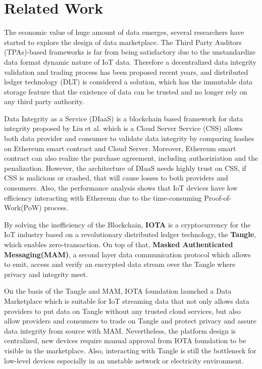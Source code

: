 \documentclass[journal,10pt,a4paper]{IEEEtran}
\begin{document}
\section{\normalsize\textbf{Related Work}}
The economic value of huge amount of data emerges, several researchers have started to explore the design of data marketplace. The Third Party Auditors (TPAs)-based frameworks\cite{TPA} is far from being satisfactory due to the unstandardize data format dynamic nature of IoT data. Therefore a decentralized data integrity validation and trading process has been proposed recent years, and distributed ledger technology (DLT) is considered a solution, which has the immutable data storage feature that the existence of data can be trusted and no longer rely on any third party authority.

Data Integrity as a Service (DIaaS) is a blockchain based framework for data integrity proposed by Liu et al.\cite{DIaas} which is a Cloud Server Service (CSS) allows both data provider and consumer to validate data integrity by comparing hashes on Ethereum smart contract\cite{smartContract} and Cloud Server. Moreover, Ethereum smart contract can also realize the purchase agreement, including authoriziation and the penalization. However, the architecture of DIaaS needs highly trust on CSS, if CSS is malicious or crashed, that will cause losses to both providers and consumers. Also, the performance analysis shows that IoT devices have low efficiency interacting with Ethereum due to the time-consuming Proof-of-Work(PoW) process.

By solving the inefficiency of the Blockchain, \textbf{IOTA}\cite{IOTAwhitepaper} is a cryptocurrency for the IoT industry based on a revolutionary distributed ledger technology, the \textbf{Tangle}, which enables zero-transaction. On top of that, \textbf{Masked Authenticated Messaging(MAM)}\cite{MAM}, a second layer data communication protocol which allows to emit, access and verify an encrypted data stream over the Tangle where privacy and integrity meet.

On the basis of the Tangle and MAM, IOTA foundation launched a Data Marketplace\cite{IOTADataMarket} which is suitable for IoT streaming data that not only allows data providers to put data on Tangle without any trusted cloud services, but also allow providers and consumers to trade on Tangle and protect privacy and assure data integrity from source with MAM. Nevertheless, the platform design is centralized, new devices require manual approval from IOTA foundation to be visible in the marketplace. Also, interacting with Tangle is still the bottleneck for low-level devices especially in an unstable network or electricity environment.
\end{document}
